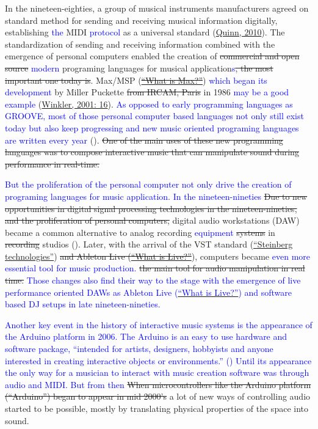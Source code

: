 \documentclass[a4paper,11pt]{article}
\newcommand{\new}[1]{\textcolor{blue}{#1}}
\begin{document}
In the nineteen-eighties, a group of musical instruments manufacturers agreed on standard method for sending and receiving musical information digitally, establishing \new{the }MIDI \new{protocol} as a universal standard (\href{http://www.insidetechnology360.com/index.php/the-history-of-midi-8862/}{Quinn, 2010}). The standardization of sending and receiving information combined with the emergence of personal computers enabled the creation of \st{commercial and open source} \new{modern} programing languages for musical application\new{s}\st{, the most important one today is}. Max/MSP (\href{http://cycling74.com/whatismax/}{\st{``What is Max?''}}) \new{which began its development} by Miller Puckette \st{from IRCAM, Paris} in 1986 \new{may be a good example} (\href{http://blog.lib.umn.edu/geers001/emusic/14_assig_ComposingInteractiveMusicCh1-2.pdf}{Winkler, 2001: 16}). \new{As opposed to early programming languages as GROOVE, most of those personal computer based languages not only still exist today but also keep progressing and new music oriented programing languages are written every year} ().\st{ One of the main uses of these new programming languages was to compose interactive music that can manipulate sound during performance in real-time.}

\new{But the proliferation of the personal computer not only drive the creation of programing languages for music application. In the nineteen-nineties} \st{Due to new opportunities in digital signal processing technologies in the nineteen-nineties, and the proliferation of personal computers,} digital audio workstations (DAW) became a common alternative to analog recording \new{equipment} \st{systems} in \st{recording} studios (). Later, with the arrival of the VST standard (\href{http://www.steinberg.net/en/company/technologies.html}{``Steinberg technologies''}) \st{and Ableton Live (}\href{https://www.ableton.com/en/live/}{\st{``What is Live?''}}), computers became \new{even more essential tool for music production.} \st{the main tool for audio manipulation in real time.} \new{Those changes also find their way to the stage with the emergence of live performance oriented DAWs as Ableton Live (}\href{https://www.ableton.com/en/live/}{\new{``What is Live?''}}\new{) and software based DJ setups in late nineteen-nineties.} 

\new{Another key event in the history of interactive music systems is the appearance of the Arduino platform in 2006. The Arduino is an easy to use hardware and software package, ``intended for artists, designers, hobbyists and anyone interested in creating interactive objects or environments.'' (}\new{) Until its appearance the only way for a musician to interact with music creation software was through audio and MIDI. But from then }\st{When microcontrollers like the Arduino platform (``Arduino'') began to appear in mid 2000's} a lot of new ways of controlling audio started to be possible, mostly by translating physical properties of the space into sound.
\end{document}
